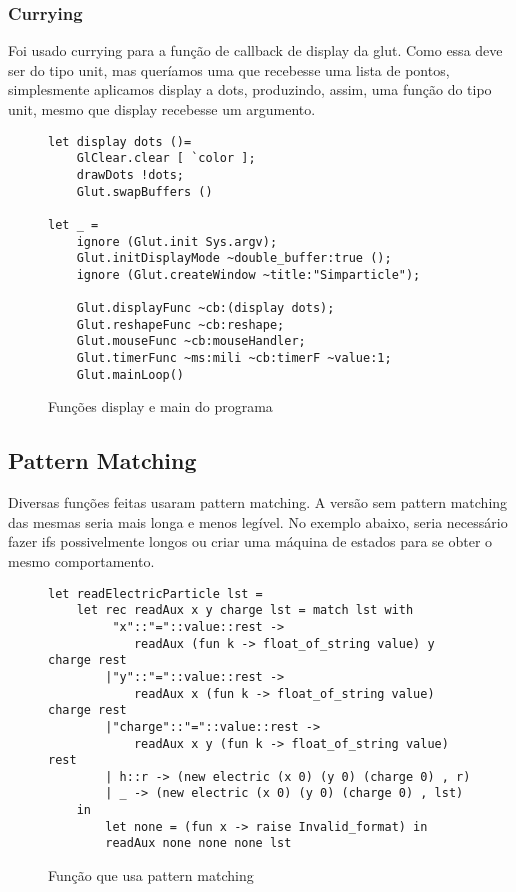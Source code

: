 \documentclass[a4paper,10pt]{article}
\begin{document}
\subsubsection{Currying}
	
	Foi usado currying para a função de callback de display da glut. Como essa deve ser do tipo unit, mas queríamos uma que recebesse uma lista de pontos, simplesmente aplicamos display a dots, produzindo, assim, uma função do tipo unit, mesmo que display recebesse um argumento.
	
	\begin{figure}[H]
	\centering	
	\begin{lstlisting}
let display dots ()=
	GlClear.clear [ `color ];
	drawDots !dots;
	Glut.swapBuffers ()
	
let _ = 
	ignore (Glut.init Sys.argv);
	Glut.initDisplayMode ~double_buffer:true ();
	ignore (Glut.createWindow ~title:"Simparticle");

	Glut.displayFunc ~cb:(display dots);
	Glut.reshapeFunc ~cb:reshape;
	Glut.mouseFunc ~cb:mouseHandler;
	Glut.timerFunc ~ms:mili ~cb:timerF ~value:1;
	Glut.mainLoop()
	\end{lstlisting}
	\caption{Funções display e main do programa}
\end{figure}
	
\subsection{Pattern Matching}

Diversas funções feitas usaram pattern matching. A versão sem pattern matching das mesmas seria mais longa e menos legível. No exemplo abaixo, seria necessário fazer ifs possivelmente longos ou criar uma máquina de estados para se obter o mesmo comportamento.

\begin{figure}[H]
	\centering	
	\begin{lstlisting}
let readElectricParticle lst =
	let rec readAux x y charge lst = match lst with
		 "x"::"="::value::rest -> 
			readAux (fun k -> float_of_string value) y charge rest
		|"y"::"="::value::rest -> 
			readAux x (fun k -> float_of_string value) charge rest
		|"charge"::"="::value::rest ->
			readAux x y (fun k -> float_of_string value) rest
		| h::r -> (new electric (x 0) (y 0) (charge 0) , r)
		| _ -> (new electric (x 0) (y 0) (charge 0) , lst)
	in
		let none = (fun x -> raise Invalid_format) in
		readAux none none none lst
	\end{lstlisting}
	\caption{Função que usa pattern matching}
\end{figure}
\end{document}
